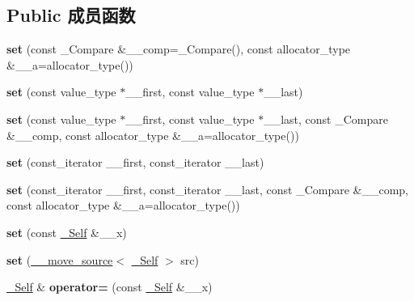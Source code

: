 \subsection*{Public 成员函数}
\begin{DoxyCompactItemize}
\item 
\mbox{\label{classset_addbe7aeae62da571f156ab7a6dcbeafa}} 
{\bfseries set} (const \+\_\+\+Compare \&\+\_\+\+\_\+comp=\+\_\+\+Compare(), const allocator\+\_\+type \&\+\_\+\+\_\+a=allocator\+\_\+type())
\item 
\mbox{\label{classset_af177b637cb37a03ff2de6179dc778765}} 
{\bfseries set} (const value\+\_\+type $\ast$\+\_\+\+\_\+first, const value\+\_\+type $\ast$\+\_\+\+\_\+last)
\item 
\mbox{\label{classset_a04ee8d0f65ed237bb285d58b0679d50f}} 
{\bfseries set} (const value\+\_\+type $\ast$\+\_\+\+\_\+first, const value\+\_\+type $\ast$\+\_\+\+\_\+last, const \+\_\+\+Compare \&\+\_\+\+\_\+comp, const allocator\+\_\+type \&\+\_\+\+\_\+a=allocator\+\_\+type())
\item 
\mbox{\label{classset_a0e21bc86229a83e89ef09fc009436a6b}} 
{\bfseries set} (const\+\_\+iterator \+\_\+\+\_\+first, const\+\_\+iterator \+\_\+\+\_\+last)
\item 
\mbox{\label{classset_a992b020f3a764655b8437125877d1213}} 
{\bfseries set} (const\+\_\+iterator \+\_\+\+\_\+first, const\+\_\+iterator \+\_\+\+\_\+last, const \+\_\+\+Compare \&\+\_\+\+\_\+comp, const allocator\+\_\+type \&\+\_\+\+\_\+a=allocator\+\_\+type())
\item 
\mbox{\label{classset_a4b70580b96fef9ddca0119cfad2ef2b3}} 
{\bfseries set} (const \hyperlink{classset}{\+\_\+\+Self} \&\+\_\+\+\_\+x)
\item 
\mbox{\label{classset_a3b09fb1f10f5d203e4c215ee19d3d306}} 
{\bfseries set} (\hyperlink{class____move__source}{\+\_\+\+\_\+move\+\_\+source}$<$ \hyperlink{classset}{\+\_\+\+Self} $>$ src)
\item 
\mbox{\label{classset_a25b44a8513c3ac8df666464ef68c2c4b}} 
\hyperlink{classset}{\+\_\+\+Self} \& {\bfseries operator=} (const \hyperlink{classset}{\+\_\+\+Self} \&\+\_\+\+\_\+x)

\end{DoxyCompactItemize}
